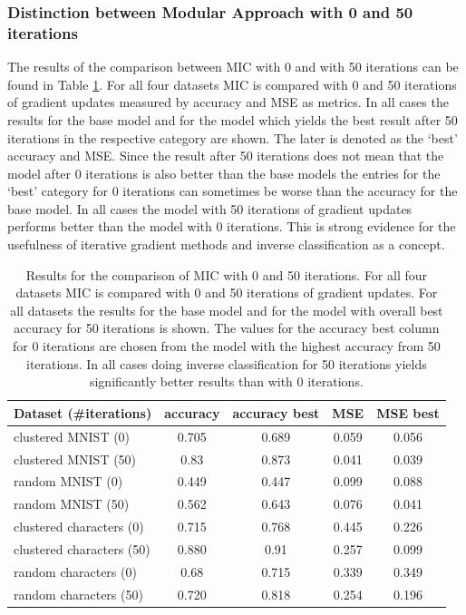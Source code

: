 \documentclass{article}
\begin{document}
\subsubsection{Distinction between Modular Approach with 0 and 50 iterations}

The results of the comparison between MIC with 0 and with 50 iterations can be found in Table \ref{table:modular_vs_MIC}. For all four datasets MIC is compared with 0 and 50 iterations of gradient updates measured by accuracy and MSE as metrics. In all cases the results for the base model and for the model which yields the best result after 50 iterations in the respective category are shown. The later is denoted as the `best' accuracy and MSE. Since the result after 50 iterations does not mean that the model after 0 iterations is also better than the base models the entries for the `best' category for 0 iterations can sometimes be worse than the accuracy for the base model. In all cases the model with 50 iterations of gradient updates performs better than the model with 0 iterations. This is strong evidence for the usefulness of iterative gradient methods and inverse classification as a concept. 

\begin{table}[!htb]
	\centering
	\caption{Results for the comparison of MIC with 0 and 50 iterations. For all four datasets MIC is compared with 0 and 50 iterations of gradient updates. For all datasets the results for the base model and for the model with overall best accuracy for 50 iterations is shown. The values for the accuracy best column for 0 iterations are chosen from the model with the highest accuracy from 50 iterations. In all cases doing inverse classification for 50 iterations yields significantly better results than with 0 iterations.}
	\begin{tabular}{l | cccc}
		\toprule
		Dataset (\#iterations) & accuracy & accuracy best & MSE & MSE best \\ 
		\midrule
		clustered MNIST (0) & 0.705 & 0.689 & 0.059 & 0.056 \\
		clustered MNIST (50)& 0.83 & 0.873 & 0.041 & 0.039 \\
		\hdashline
		random MNIST (0) & 0.449 & 0.447 & 0.099 & 0.088\\
		random MNIST (50) & 0.562 & 0.643 & 0.076 & 0.041\\
		\hdashline
		clustered characters (0) & 0.715 & 0.768 & 0.445 & 0.226\\
		clustered characters (50) & 0.880 & 0.91 & 0.257 & 0.099\\
		\hdashline
		random characters (0) & 0.68 & 0.715 & 0.339 & 0.349\\
		random characters (50) & 0.720 & 0.818 & 0.254 & 0.196\\
		\bottomrule
	\end{tabular}
	\label{table:modular_vs_MIC}
\end{table}
\end{document}
